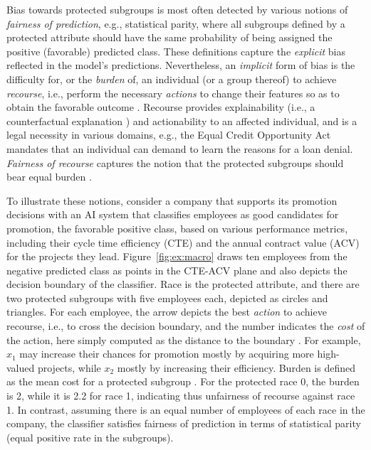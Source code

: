\documentclass{article}
\begin{document}
Bias towards protected subgroups is most often detected by various notions of \emph{fairness of prediction}, e.g., statistical parity, where all subgroups defined by a protected attribute should have the same probability of being assigned the positive (favorable) predicted class. These definitions capture the \emph{explicit} bias reflected in the model's predictions. Nevertheless, an \emph{implicit} form of bias is the difficulty for, or the \emph{burden} \cite{2020_AIES_SHG,kuratomi2023measuring} of, an individual (or a group thereof) to achieve \emph{recourse}, i.e., perform the necessary \emph{actions} to change their features so as to obtain the favorable outcome \cite{gupta2019equalizing, ustun2019actionable}. Recourse provides explainability (i.e., a counterfactual explanation \cite{wachter2017counterfactual}) and actionability to an affected individual, and is a legal necessity in various domains, e.g., the Equal Credit Opportunity Act mandates that an individual can demand to learn the reasons for a loan denial. \emph{Fairness of recourse} captures the notion that the protected subgroups should bear equal burden \cite{gupta2019equalizing,karimi2022survey,KugelgenKBVWS22,kuratomi2023measuring}.


To illustrate these notions, consider a company that supports its promotion decisions with an AI system that classifies employees as good candidates for promotion, the favorable positive class, based on various performance metrics, including their cycle time efficiency (CTE) and the annual contract value (ACV) for the projects they lead. Figure~\ref{fig:ex:macro} draws ten employees from the negative predicted class as points in the CTE-ACV plane and also depicts the decision boundary of the classifier. Race is the protected attribute, and there are two protected subgroups with five employees each, depicted as circles and triangles. For each employee, the arrow depicts the best \emph{action} to achieve recourse, i.e., to cross the decision boundary, and the number indicates the \emph{cost} of the action, here simply computed as the distance to the boundary \cite{gupta2019equalizing}. For example, $x_1$ may increase their chances for promotion mostly by acquiring more high-valued projects, while $x_2$ mostly by increasing their efficiency.
Burden is defined as the mean cost for a protected subgroup \cite{2020_AIES_SHG}. For the protected race 0, the burden is 2, while it is 2.2 for race 1, indicating thus unfairness of recourse against race 1. In contrast, assuming there is an equal number of employees of each race in the company, the classifier satisfies fairness of prediction in terms of statistical parity (equal positive rate in the subgroups).
\end{document}
